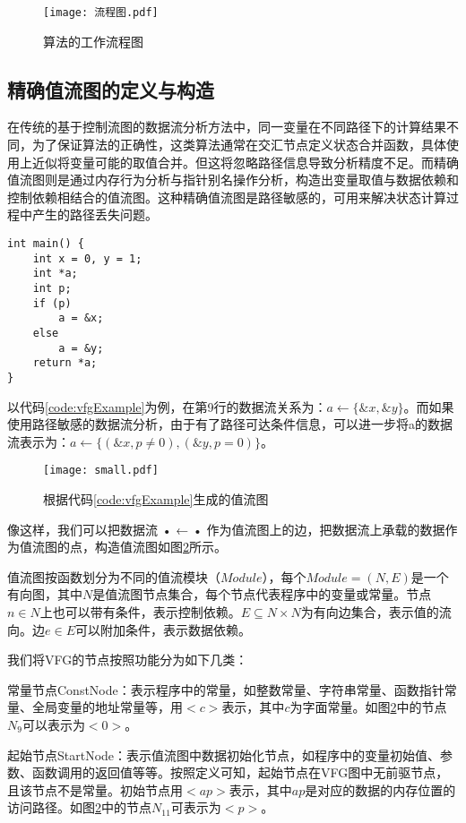 \begin{figure}[H]
	\centering
	\texttt{[image: 流程图.pdf]}
	\caption{算法的工作流程图}
	\label{fig:流程图}
\end{figure}

\subsection{精确值流图的定义与构造}

在传统的基于控制流图的数据流分析方法中，同一变量在不同路径下的计算结果不同，为了保证算法的正确性，这类算法通常在交汇节点定义状态合并函数，具体使用上近似将变量可能的取值合并。但这将忽略路径信息导致分析精度不足。而精确值流图则是通过内存行为分析与指针别名操作分析，构造出变量取值与数据依赖和控制依赖相结合的值流图。这种精确值流图是路径敏感的，可用来解决状态计算过程中产生的路径丢失问题。

\begin{lstlisting}[label=code:vfgExample,caption=代码样例]
int main() {
	int x = 0, y = 1;
	int *a;
	int p;
	if (p)
		a = &x;
	else
		a = &y;
	return *a;
}
\end{lstlisting}

以代码\ref{code:vfgExample}为例，在第9行的数据流关系为：$ a \gets \{\&x, \&y\} $。而如果使用路径敏感的数据流分析，由于有了路径可达条件信息，可以进一步将a的数据流表示为：$ a \gets \{(\&x, p ≠ 0), (\&y, p = 0)\} $。

\begin{figure}[H]
	\centering
	\texttt{[image: small.pdf]}
	\caption{根据代码\ref{code:vfgExample}生成的值流图}
	\label{fig:small}
\end{figure}

像这样，我们可以把数据流 • ← • 作为值流图上的边，把数据流上承载的数据作为值流图的点，构造值流图如图\ref{fig:small}所示。

值流图按函数划分为不同的值流模块（$ Module $），每个$ Module = (N, E) $是一个有向图，其中$ N $是值流图节点集合，每个节点代表程序中的变量或常量。节点$ n ∈ N $上也可以带有条件，表示控制依赖。$ E ⊆ N × N $为有向边集合，表示值的流向。边$ e ∈ E $可以附加条件，表示数据依赖。

我们将VFG的节点按照功能分为如下几类：

常量节点ConstNode：表示程序中的常量，如整数常量、字符串常量、函数指针常量、全局变量的地址常量等，用$ <c> $表示，其中$ c $为字面常量。如图\ref{fig:small}中的节点$ N_{9} $可以表示为$ <0> $。

起始节点StartNode：表示值流图中数据初始化节点，如程序中的变量初始值、参数、函数调用的返回值等等。按照定义可知，起始节点在VFG图中无前驱节点，且该节点不是常量。初始节点用$ <ap> $表示，其中$ ap $是对应的数据的内存位置的访问路径。如图\ref{fig:small}中的节点$ N_{11} $可表示为$ <p> $。

